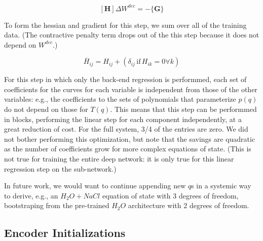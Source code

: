 \documentclass[]{article}
\begin{document}
\[[\mathbf{H}] \Delta W^{dec} = -\{\mathbf{G}\}\]

To form the hessian and gradient for this step, we sum over all of the
training data. (The contractive penalty term drops out of the this step because it does
not depend on \(W^{dec}\).)

\begin{equation}
\bar{H}_{ij} = H_{ij} + \left(\delta_{ij}\,\text{if}\,H_{ik}=0\forall k\right)
  \end{equation}

For this step in which only the back-end regression is performmed, each set of coefficients for the curves for each variable is independent from those of the other variables: e.g., the coefficients to the sets of polynomials that parameterize $p(q)$ do not depend on those for $T(q)$. This means that this step can be performmed in blocks, performing the linear step for each component independently, at a great reduction of cost. For the full system, 3/4 of the entries are zero. We did not bother performing this optimization, but note that the savings are quadratic as the number of coefficients grow for more complex equations of state. (This is not true for training the entire deep network: it is only true for this linear regression step on the sub-network.)

In future work, we would want to continue appending new \(q\)s in a
systemic way to derive, e.g., an \(H_2O + NaCl\) equation of state with
3 degrees of freedom, bootstraping from the pre-trained \(H_2O\)
architecture with 2 degrees of freedom.

\hypertarget{header-n3312}{%
\subsection{Encoder Initializations}\label{header-n3312}}
\end{document}
